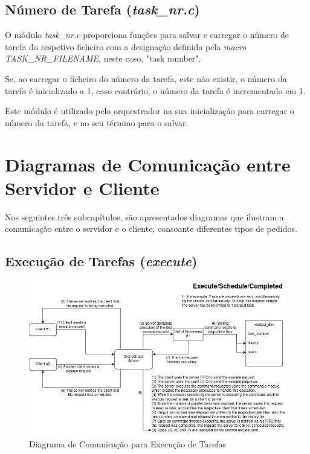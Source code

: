 \documentclass[a4paper,11pt]{scrreprt}
\begin{document}
        \subsection{Número de Tarefa (\textit{task\_nr.c})}
            O módulo \textit{task\_nr.c} proporciona funções para salvar e carregar o número
            de tarefa do respetivo ficheiro com a designação definida pela
            \textit{macro TASK\_NR\_FILENAME}, neste caso, "task number".

            Se, ao carregar o ficheiro do número da tarefa, este não existir,
            o número da tarefa é inicializado a 1,
            caso contrário, o número da tarefa é incrementado em 1.

            Este módulo é utilizado pelo orquestrador na sua inicialização para carregar o
            número da tarefa, e no seu término para o salvar.

    \clearpage
    \section{Diagramas de Comunicação entre Servidor e Cliente}
        \label{sec:1.3}
        Nos seguintes três subcapítulos, são apresentados diagramas que ilustram a comunicação
        entre o servidor e o cliente, consoante diferentes tipos de pedidos.
        \subsection{Execução de Tarefas (\textit{execute})}
                \begin{figure}[!ht]
                    \centering
                    \includegraphics[width=\textwidth]{diagrams/execute.png}
                    \caption{\small Diagrama de Comunicação para Execução de Tarefas}
                    \label{fig:1.2}
                \end{figure}
\end{document}
